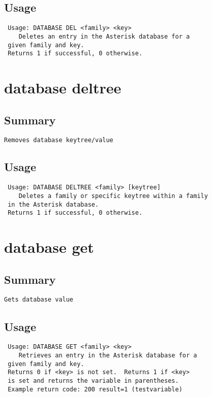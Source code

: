 \subsection{Usage}
\begin{verbatim}
 Usage: DATABASE DEL <family> <key>
	Deletes an entry in the Asterisk database for a
 given family and key.
 Returns 1 if successful, 0 otherwise.

\end{verbatim}


\section{database deltree}
\subsection{Summary}
\begin{verbatim}
Removes database keytree/value
\end{verbatim}
\subsection{Usage}
\begin{verbatim}
 Usage: DATABASE DELTREE <family> [keytree]
	Deletes a family or specific keytree within a family
 in the Asterisk database.
 Returns 1 if successful, 0 otherwise.

\end{verbatim}


\section{database get}
\subsection{Summary}
\begin{verbatim}
Gets database value
\end{verbatim}
\subsection{Usage}
\begin{verbatim}
 Usage: DATABASE GET <family> <key>
	Retrieves an entry in the Asterisk database for a
 given family and key.
 Returns 0 if <key> is not set.  Returns 1 if <key>
 is set and returns the variable in parentheses.
 Example return code: 200 result=1 (testvariable)

\end{verbatim}


